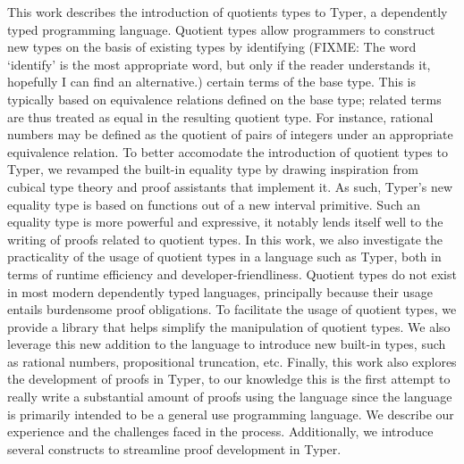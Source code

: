 \documentclass[12pt,twoside,maitrise]{dms}
\theoremstyle{definition}
\numberwithin{equation}{section}
\numberwithin{table}{chapter}
\numberwithin{figure}{chapter}
\begin{document}
This work describes the introduction of quotients types to Typer, a dependently
typed programming language. Quotient types allow programmers to construct new
types on the basis of existing types by identifying (FIXME: The word `identify'
is the most appropriate word, but only if the reader understands it, hopefully I
can find an alternative.) certain terms of the base type. This is typically
based on equivalence relations defined on the base type; related terms are thus
treated as equal in the resulting quotient type. For instance, rational numbers
may be defined as the quotient of pairs of integers under an appropriate
equivalence relation. To better accomodate the introduction of quotient types to
Typer, we revamped the built-in equality type by drawing inspiration from
cubical type theory and proof assistants that implement it. As such, Typer's new
equality type is based on functions out of a new interval primitive. Such an
equality type is more powerful and expressive, it notably lends itself well to
the writing of proofs related to quotient types. In this work, we also
investigate the practicality of the usage of quotient types in a language such
as Typer, both in terms of runtime efficiency and developer-friendliness.
Quotient types do not exist in most modern dependently typed languages,
principally because their usage entails burdensome proof obligations. To
facilitate the usage of quotient types, we provide a library that helps simplify
the manipulation of quotient types. We also leverage this new addition to the
language to introduce new built-in types, such as rational numbers,
propositional truncation, etc. Finally, this work also explores the development
of proofs in Typer, to our knowledge this is the first attempt to really write a
substantial amount of proofs using the language since the language is primarily
intended to be a general use programming language. We describe our experience
and the challenges faced in the process. Additionally, we introduce several
constructs to streamline proof development in Typer.



\anglais
\end{document}
